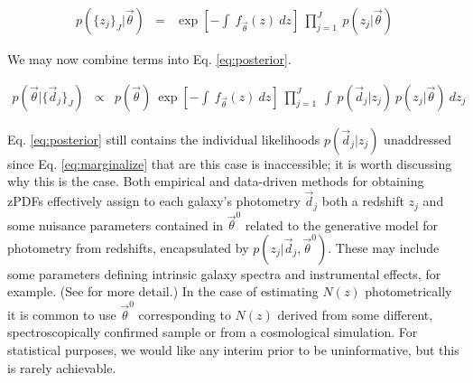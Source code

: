 \documentclass[preprint]{aastex}
\begin{document}
\begin{eqnarray}
\label{eq:indie}
p(\{z_{j}\}_{J}|\vec{\theta}) &=& \exp\left[-\int\ f_{\vec{\theta}}(z)\ dz\right]\ \prod_{j=1}^{J}\ p(z_{j}|\vec{\theta})
\end{eqnarray}


We may now combine terms into Eq. \ref{eq:posterior}.

\begin{eqnarray}
\label{eq:posterior}
p(\vec{\theta}|\{\vec{d}_{j}\}_{J}) &\propto& p(\vec{\theta})\ \exp\left[-\int\ f_{\vec{\theta}}(z)\ dz\right]\ \prod_{j=1}^{J}\ \int\ p(\vec{d}_{j}|z_{j})\ p(z_{j}|\vec{\theta})\ dz_{j}
\end{eqnarray}

Eq. \ref{eq:posterior} still contains the individual likelihoods $p(\vec{d}_{j}|z_{j})$ unaddressed since Eq. \ref{eq:marginalize} that are this case is inaccessible; it is worth discussing why this is the case.  Both empirical and data-driven methods for obtaining zPDFs effectively assign to each galaxy's photometry $\vec{d}_{j}$ both a redshift $z_{j}$ and some nuisance parameters contained in $\vec{\theta}^{0}$ related to the generative model for photometry from redshifts, encapsulated by $p(z_{j}|\vec{d}_{j},\vec{\theta}^{0})$.  These may include some parameters defining intrinsic galaxy spectra and instrumental effects, for example. (See \citet{ben98} for more detail.)  In the case of estimating $N(z)$ photometrically it is common to use $\vec{\theta}^{0}$ corresponding to $N(z)$ derived from some different, spectroscopically confirmed sample or from a cosmological simulation.  For statistical purposes, we would like any interim prior to be uninformative, but this is rarely achievable.

\end{document}

